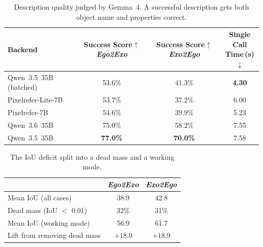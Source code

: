 \begin{table}
    \centering
    \setlength{\tabcolsep}{4pt}
    \caption{Description quality judged by Gemma~4. A successful description gets both object name and properties correct.}
    \label{tab:abl-vlm}
    \begin{tabular}{l ccc}
      \toprule
      Backend & \shortstack{Success Score$\uparrow$\\\textit{Ego2Exo}}
              & \shortstack{Success Score$\uparrow$\\\textit{Exo2Ego}}
              & \shortstack[c]{Single Call \\ Time\,(s)}$\downarrow$ \\
      \midrule
      Qwen~3.5~35B (batched) & 53.6\% & 41.3\% & \textbf{4.30} \\
      Pixelrefer-Lite-7B  & 53.7\% & 37.2\% & 6.00 \\
      Pixelrefer-7B       & 54.6\% & 39.9\% & 5.23 \\
      Qwen~3.6~35B        & 75.0\% & 58.2\% & 7.55 \\
      Qwen~3.5~35B        & \textbf{77.0\%} & \textbf{70.0\%} & 7.58 \\
      \bottomrule
    \end{tabular}
\end{table}

\begin{table}[t]
  \centering
  \setlength{\tabcolsep}{6pt}
  \caption{The IoU deficit split into a dead mass and a working mode.}
  \label{tab:bimodal}
  \begin{tabular}{lcc}
  \toprule
  & \textit{Ego2Exo} & \textit{Exo2Ego} \\
  \midrule
  Mean IoU (all cases)        & 38.9 & 42.8 \\
  Dead mass (IoU $<$ 0.01)    & 32\%  & 31\%  \\
  Mean IoU (working mode)     & 56.9 & 61.7 \\
  Lift from removing dead mass & $+18.0$ & $+18.9$ \\
  \bottomrule
  \end{tabular}
\end{table}


